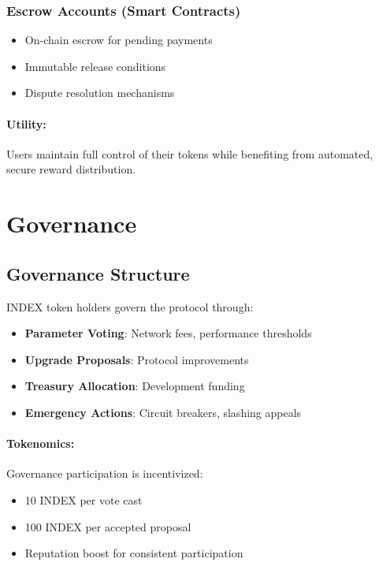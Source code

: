 \documentclass[12pt,a4paper]{article}
\begin{document}
\subsubsection{Escrow Accounts (Smart Contracts)}
\begin{itemize}
    \item On-chain escrow for pending payments \cite{solanaaudit2024}
    \item Immutable release conditions
    \item Dispute resolution mechanisms
\end{itemize}

\paragraph{Utility:} Users maintain full control of their tokens while benefiting from automated, secure reward distribution.

\section{Governance}

\subsection{Governance Structure}

INDEX token holders govern the protocol through:

\begin{itemize}
    \item \textbf{Parameter Voting}: Network fees, performance thresholds
    \item \textbf{Upgrade Proposals}: Protocol improvements
    \item \textbf{Treasury Allocation}: Development funding
    \item \textbf{Emergency Actions}: Circuit breakers, slashing appeals
\end{itemize}

\paragraph{Tokenomics:} Governance participation is incentivized:
\begin{itemize}
    \item 10 INDEX per vote cast
    \item 100 INDEX per accepted proposal
    \item Reputation boost for consistent participation
\end{itemize}
\end{document}

